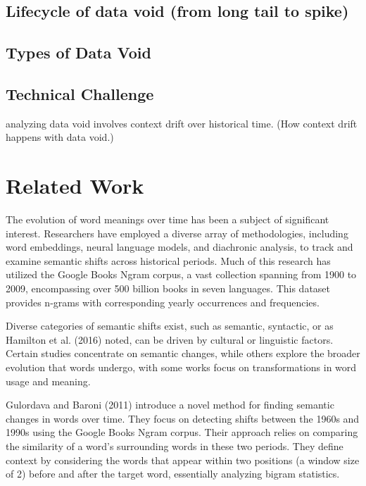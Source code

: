 \documentclass[12pt]{article}
\begin{document}
\subsection{Lifecycle of data void (from long tail to spike)}
\subsection{Types of Data Void}
\subsection{Technical Challenge}
analyzing data void involves context drift over historical time. (How context drift happens with data void.)

\newpage
\section{Related Work} \label{sec:relatedwork}
The evolution of word meanings over time has been a subject of significant interest.
Researchers have employed a diverse array of methodologies, including word embeddings, neural language models, and diachronic analysis, to track and examine semantic shifts across historical periods.
Much of this research has utilized the Google Books Ngram corpus, a vast collection spanning from 1900 to 2009, encompassing over 500 billion books in seven languages.
This dataset provides n-grams with corresponding yearly occurrences and frequencies.

Diverse categories of semantic shifts exist, such as semantic, syntactic, or as Hamilton et al. (2016) noted, can be driven by cultural or linguistic factors.
Certain studies concentrate on semantic changes, while others explore the broader evolution that words undergo, with some works focus on transformations in word usage and meaning.

\vspace{5mm}
Gulordava and Baroni (2011) introduce a novel method for finding semantic changes in words over time.
They focus on detecting shifts between the 1960s and 1990s using the Google Books Ngram corpus.
Their approach relies on comparing the similarity of a word's surrounding words in these two periods.
They define context by considering the words that appear within two positions (a window size of 2) before and after the target word, essentially analyzing bigram statistics.
\end{document}
